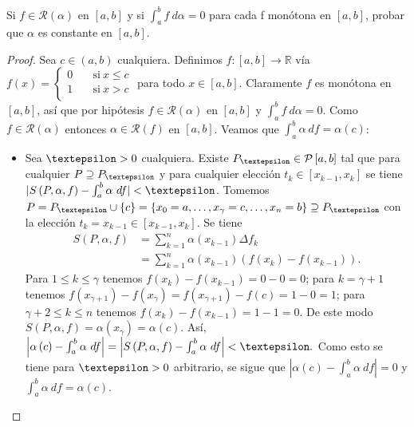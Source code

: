 \begin{exercise}
  Si $f\in \mathcal{R}\left(\alpha\right)$ en $\left[a,b\right]$ y si $\int_a^b f\ d\alpha=0$ para cada f monótona en $\left[a,b\right]$, probar que $\alpha$ es constante en $\left[a,b\right]$.
\end{exercise}

\begin{proof}
  Sea $c\in\left(a,b\right)$ cualquiera. Definimos $f:\left[a,b\right]\rightarrow\mathds{R}$ vía
  $f(x)=\begin{cases}
    0 \quad &\text{si}\ x \leq c \\
    1 \quad &\text{si}\ x >c \\
  \end{cases}$
  \quad para todo $x\in\left[a,b\right]$. Claramente $f$ es monótona en $\left[a,b\right]$, así que por hipótesis $f\in\mathcal{R}\left(\alpha\right)$ en $\left[a,b\right]$ y $\int_a^b f\ d\alpha=0$. Como $f\in\mathcal{R}\left(\alpha\right)$ entonces $\alpha\in\mathcal{R}\left(f\right)$ en $\left[a,b\right]$. Veamos que $\int_a^b \alpha\ df = \alpha\left(c\right)$:
  \begin{itemize}
    \item[]Sea $\text{\textepsilon}>0$ cualquiera. Existe $P_{\text{\textepsilon}}\in \mathcal{P}\left[a,b\right] $ tal que para cualquier $P\supseteq P_{\text{\textepsilon}}$ y para cualquier elección $t_k\in\left[x_{k-1},x_k\right]$ se tiene $|S\left(P,\alpha,f\right)-\int_a^b\alpha\ df|<\text{\textepsilon}$. Tomemos $P=P_{\text{\textepsilon}}\cup\left\lbrace c \right\rbrace=\left\lbrace x_0=a,\dots,x_\gamma=c,\dots,x_n=b \right\rbrace\supseteq P_{\text{\textepsilon}}$ con la elección $t_k=x_{k-1}\in\left[x_{k-1},x_k\right]$. Se tiene
    \begin{align*}
      S\left(P,\alpha,f\right)&=\sum_{k=1}^{n}\alpha\left(x_{k-1}\right)\Delta f_k\\
      &=\sum_{k=1}^{n}\alpha\left(x_{k-1}\right)\left(f\left(x_k\right)-f\left(x_{k-1}\right)\right).
    \end{align*}
    Para $1\leq k\leq \gamma$ tenemos $f\left(x_k\right)-f\left(x_{k-1}\right)=0-0=0$; para $k=\gamma +1$ tenemos $f\left(x_{\gamma+1}\right)-f\left(x_{\gamma}\right)=f\left(x_{\gamma+1}\right)-f\left(c\right)=1-0=1$; para $\gamma+2\leq k\leq n$ tenemos $f\left(x_k\right)-f\left(x_{k-1}\right)=1-1=0$. De este modo $S\left(P,\alpha,f\right)=\alpha\left(x_\gamma\right)=\alpha\left(c\right)$. Así, $\left|\alpha\left(c\right)-\int_a^b \alpha\ df\right|= \left|S\left(P,\alpha,f\right)-\int_a^b \alpha\ df\right|<\text{\textepsilon}.$ Como esto se tiene para $\text{\textepsilon}>0$ arbitrario, se sigue que $\left|\alpha\left(c\right)-\int_a^b\alpha\ df\right|=0$ y $\int_a^b\alpha\ df=\alpha\left(c\right)$.

\end{itemize}
\end{proof}
